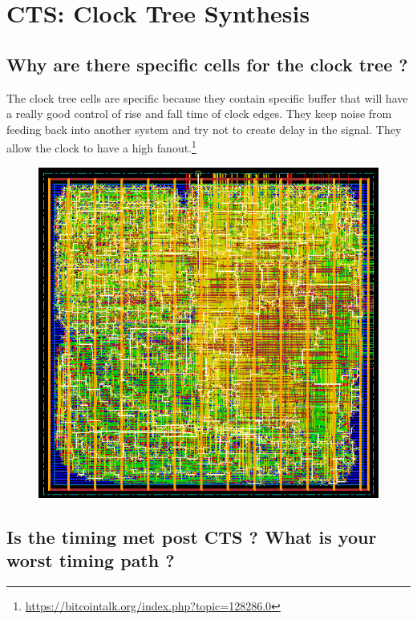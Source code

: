 \documentclass[11pt,a4paper,sans,dvipsnames]{report}
\begin{document}
	\newpage
	\section{CTS: Clock Tree Synthesis}

	\subsection*{Why are there specific cells for the clock tree ?}
	The clock tree cells are specific because they contain specific buffer that will have a really good control of rise and fall time of clock edges. They keep noise from feeding back into another system and try not to create delay in the signal. They allow the clock to have a high fanout.\footnote{\url{https://bitcointalk.org/index.php?topic=128286.0}}

	\begin{figure}[h!]
		\centering
		\includegraphics[width=0.60\linewidth, frame]{images/clocktree.png}
		\label{fig:clock_tree}
	\end{figure}

	\subsection*{Is the timing met post CTS ? What is your worst timing path ?}
\end{document}
